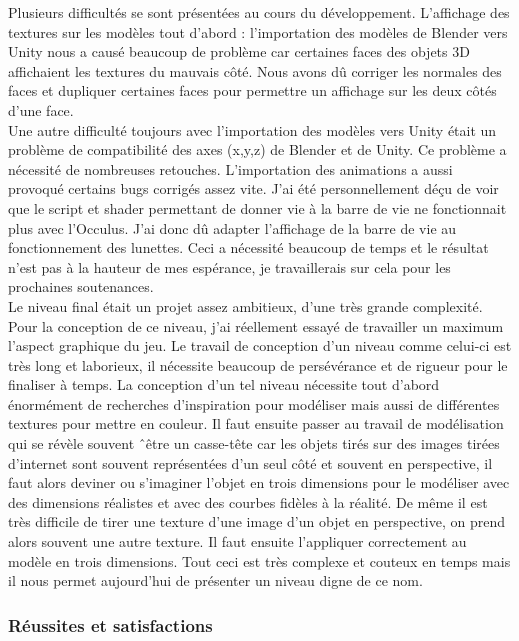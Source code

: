 \documentclass[12pt]{article}
\begin{document}
Plusieurs difficultés se sont présentées au cours du développement. L’affichage des textures sur les modèles tout d’abord : l’importation des modèles de Blender vers Unity nous a causé beaucoup de problème car certaines faces des objets 3D affichaient les textures du mauvais côté. Nous avons dû corriger les normales des faces et dupliquer certaines faces pour permettre un affichage sur les deux côtés d’une face.\\
Une autre difficulté toujours avec l’importation des modèles vers Unity était un problème de compatibilité des axes (x,y,z) de Blender et de Unity. Ce problème a nécessité de nombreuses retouches. L’importation des animations a aussi provoqué certains bugs corrigés assez vite.
J’ai été personnellement déçu de voir que le script et shader permettant de donner vie à la barre de vie ne fonctionnait plus avec l’Occulus. J’ai donc dû adapter l’affichage de la barre de vie au fonctionnement des lunettes. Ceci a nécessité beaucoup de temps et le résultat n’est pas à la hauteur de mes espérance, je travaillerais sur cela pour les prochaines soutenances.\\
Le niveau final était un projet assez ambitieux, d’une très grande complexité. Pour la conception de ce niveau, j’ai réellement essayé de travailler un maximum l’aspect graphique du jeu. Le travail de conception d’un niveau comme celui-ci est très long et laborieux, il nécessite beaucoup de persévérance et de rigueur pour le finaliser à temps. La conception d’un tel niveau nécessite tout d’abord énormément de recherches d’inspiration pour modéliser mais aussi de différentes textures pour mettre en couleur. Il faut ensuite passer au travail de modélisation qui se révèle souvent ˆêtre un casse-tête car les objets tirés sur des images tirées d’internet sont souvent représentées d’un seul côté et souvent en perspective, il faut alors deviner ou s’imaginer l’objet en trois dimensions pour le modéliser avec des dimensions réalistes et avec des courbes fidèles à la réalité. De même il est très difficile de tirer une texture d’une image d’un objet en perspective, on prend alors souvent une autre texture. Il faut ensuite l’appliquer correctement au modèle en trois dimensions. Tout ceci est très complexe et couteux en temps mais il nous permet aujourd’hui de présenter un niveau digne de ce nom.

\subsubsection{Réussites et satisfactions}
\end{document}
